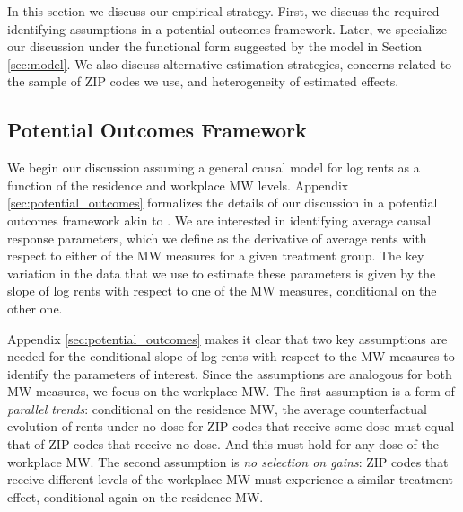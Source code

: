 
In this section we discuss our empirical strategy.
First, we discuss the required identifying assumptions in a potential outcomes 
framework.
Later, we specialize our discussion under the functional form suggested by
the model in Section \ref{sec:model}.
We also discuss alternative estimation strategies, concerns related to
the sample of ZIP codes we use, and heterogeneity of estimated effects.

\subsection{Potential Outcomes Framework}

We begin our discussion assuming a general causal model for log rents as a 
function of the residence and workplace MW levels.
Appendix \ref{sec:potential_outcomes} formalizes the details of our discussion 
in a potential outcomes framework akin to \textcite{CallawayEtAl2021}.
We are interested in identifying average causal response parameters,
which we define as the derivative of average rents with respect to either
of the MW measures for a given treatment group.
The key variation in the data that we use to estimate these parameters is 
given by the slope of log rents with respect to one of the MW measures, 
conditional on the other one.

Appendix \ref{sec:potential_outcomes} makes it clear that two key assumptions 
are needed for the conditional slope of log rents with respect to the MW 
measures to identify the parameters of interest.
Since the assumptions are analogous for both MW measures, we focus on the 
workplace MW.
The first assumption is a form of \textit{parallel trends}: conditional on the 
residence MW, the average counterfactual evolution of rents under no dose for 
ZIP codes that receive some dose must equal that of ZIP codes that 
receive no dose.
And this must hold for any dose of the workplace MW.
The second assumption is \textit{no selection on gains}: ZIP codes that receive
different levels of the workplace MW must experience a similar treatment effect,
conditional again on the residence MW.

